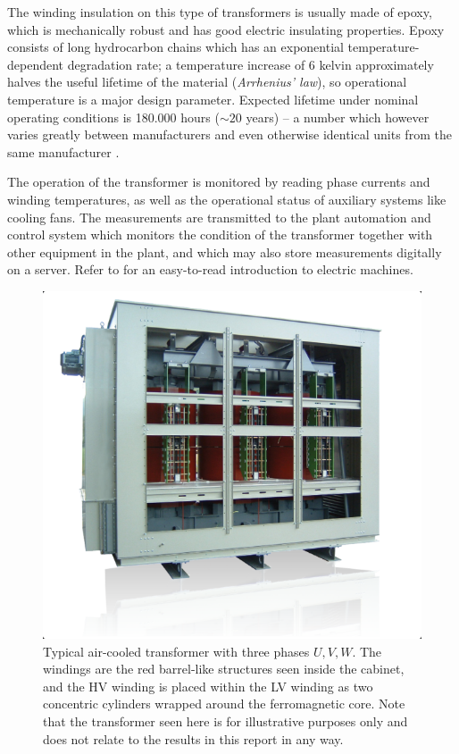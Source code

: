 \documentclass[]{article}
\begin{document}
The winding insulation on this type of transformers is usually made of epoxy, which is mechanically robust and has good electric insulating properties. Epoxy consists of long hydrocarbon chains which has an exponential temperature-dependent degradation rate; a temperature increase of 6 kelvin approximately halves the useful lifetime of the material (\textit{Arrhenius' law}), so operational temperature is a major design parameter. Expected lifetime under nominal operating conditions is 180.000 hours ($\sim 20$ years) -- a number which however varies greatly between manufacturers and even otherwise identical units from the same manufacturer \cite{iec60076-12}.

The operation of the transformer is monitored by reading phase currents and winding temperatures, as well as the operational status of auxiliary systems like cooling fans. The measurements are transmitted to the plant automation and control system which monitors the condition of the transformer together with other equipment in the plant, and which may also store measurements digitally on a server. Refer to \cite{hubert2002} for an easy-to-read introduction to electric machines.

\begin{figure}[!h]
	\centering
	\includegraphics[width=1\linewidth]{./figs/dry-transformer.png}
	\caption{Typical air-cooled transformer with three phases $U, V, W$. The windings are the red barrel-like structures seen inside the cabinet, and the HV winding is placed within the LV winding as two concentric cylinders wrapped around the ferromagnetic core. Note that the transformer seen here is for illustrative purposes only and does not relate to the results in this report in any way.}
	\label{fig:dry-transformer}
\end{figure}
\end{document}
